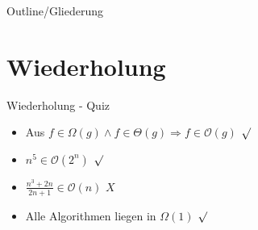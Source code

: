 
\subtitle{Foliensatz 10}
\date{10. Januar 2013}



\begin{frame}
    \titlepage
\end{frame}

\begin{frame}{Outline/Gliederung}
    \tableofcontents
\end{frame}

\section{Wiederholung}
\begin{frame} {Wiederholung - Quiz}
    \begin{itemize}
        \item Aus $f\in \Omega(g) \land f \in \Theta(g) \Rightarrow f \in \mathcal{O}(g)$
         {\color{darkgreen}$\surd$}\\
        \color{black}
                
        \item $n^5 \in \mathcal{O}(2^n)$
         {\color{darkgreen}$\surd$}\\
        \color{black}

        \item $\frac{n^3+2n}{2n+1} \in \mathcal{O}(n)$
         {\color{red}$X$}\\
        \color{black}
        
        \item Alle Algorithmen liegen in $\Omega(1)$
         {\color{darkgreen}$\surd$}\\
        \color{black}
    \end{itemize}
\end{frame}
